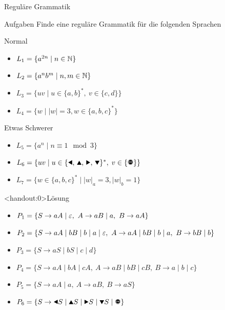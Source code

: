 {
\begin{frame}{Reguläre Grammatik}
    \begin{alertblock}{Aufgaben}
    Finde eine reguläre Grammatik für die folgenden Sprachen
    \end{alertblock}
    \begin{block}{Normal}
    \begin{itemize}
        \item $L_1 = \{a^{2n} \mid n\in\mathbb{N}\}$
        \item $L_2 = \{a^nb^m \mid n, m\in\mathbb{N}\}$
        \item $L_3 = \{uv \mid u\in\{a,b\}^\ast,\ v\in\{c,d\}\}$
        \item $L_4 = \{w \mid |w| = 3, w\in \{a,b,c\}^*\}$
    \end{itemize}
    \end{block}
    \begin{block}{Etwas Schwerer}
    \begin{itemize}
        \item $L_5 = \{a^n \mid n \equiv 1 \mod 3\}$
        \item $L_6 = \{uv\mid u\in\{\text{\Rewind, \MoveUp, \Forward, \MoveDown}\}^\ast,\;v\in\{\text{\Stopsign}\}\}$
        \item $L_7 = \{w \in \{a,b,c\}^* \mid |w|_a = 3, |w|_b = 1\}$
    \end{itemize}
    \end{block}
\end{frame}
}

{
\begin{frame}<handout:0>{Lösung}
    \begin{itemize}
        \item<1-> \alert<1>{$P_1 = \{S \to aA \mid \varepsilon,\ A \to aB \mid a,\ B \to aA\}$}
        \item<2-> \alert<2>{$P_2 = \{S \to aA \mid bB \mid b \mid a \mid \varepsilon,\ A \to aA \mid bB \mid b \mid a ,\ B \to bB \mid b\}$}
        \item<3-> \alert<3>{$P_3 = \{S \to aS \mid bS \mid c \mid d\}$}
        \item<4-> \alert<4>{$P_4 = \{S \to aA \mid bA \mid cA,\ A \to aB \mid bB \mid cB,\ B \to a \mid b \mid c\}$}
        \item<5-> \alert<5>{$P_5 = \{S \to aA \mid a,\ A \to aB,\ B \to aS\}$}
        \item<6-> \alert<6>{$P_6 = \{S \to \text{\Rewind}S \mid \text{\MoveUp}S \mid \text{\Forward}S \mid \text{\MoveDown}S \mid \text{\Stopsign}\}$}
    \end{itemize}
\end{frame}
}


